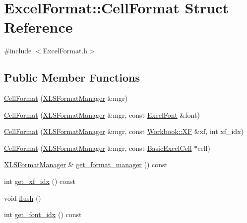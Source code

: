 \hypertarget{struct_excel_format_1_1_cell_format}{}\section{Excel\+Format\+:\+:Cell\+Format Struct Reference}
\label{struct_excel_format_1_1_cell_format}


{\ttfamily \#include $<$Excel\+Format.\+h$>$}

\subsection*{Public Member Functions}
\begin{DoxyCompactItemize}
\item 
\hyperlink{struct_excel_format_1_1_cell_format_a78f64bc1a0b7b6f7406e972d3a715bd4}{Cell\+Format} (\hyperlink{struct_excel_format_1_1_x_l_s_format_manager}{X\+L\+S\+Format\+Manager} \&mgr)
\item 
\hyperlink{struct_excel_format_1_1_cell_format_a463a56510f06cd9b73f2bb177f6a15de}{Cell\+Format} (\hyperlink{struct_excel_format_1_1_x_l_s_format_manager}{X\+L\+S\+Format\+Manager} \&mgr, const \hyperlink{struct_excel_format_1_1_excel_font}{Excel\+Font} \&font)
\item 
\hyperlink{struct_excel_format_1_1_cell_format_a1848c9d951e12897bc352a09b8bad804}{Cell\+Format} (\hyperlink{struct_excel_format_1_1_x_l_s_format_manager}{X\+L\+S\+Format\+Manager} \&mgr, const \hyperlink{struct_y_excel_1_1_workbook_1_1_x_f}{Workbook\+::\+X\+F} \&xf, int xf\+\_\+idx)
\item 
\hyperlink{struct_excel_format_1_1_cell_format_adfec20abe07d6a70571bad63d50d46da}{Cell\+Format} (\hyperlink{struct_excel_format_1_1_x_l_s_format_manager}{X\+L\+S\+Format\+Manager} \&mgr, const \hyperlink{class_y_excel_1_1_basic_excel_cell}{Basic\+Excel\+Cell} $\ast$cell)
\item 
\hyperlink{struct_excel_format_1_1_x_l_s_format_manager}{X\+L\+S\+Format\+Manager} \& \hyperlink{struct_excel_format_1_1_cell_format_a03a2431b7624a62dcbeabed790b046c3}{get\+\_\+format\+\_\+manager} () const 
\item 
int \hyperlink{struct_excel_format_1_1_cell_format_af678b79b8c8dbbb6a521c01cadd4ae5d}{get\+\_\+xf\+\_\+idx} () const 
\item 
void \hyperlink{struct_excel_format_1_1_cell_format_aeb3ceb42c80ec9f02a329f9bfa3aafdf}{flush} ()
\item 
int \hyperlink{struct_excel_format_1_1_cell_format_a5a50b4ec7c14f7144ff099a9b52301c9}{get\+\_\+font\+\_\+idx} () const 

\end{DoxyCompactItemize}
